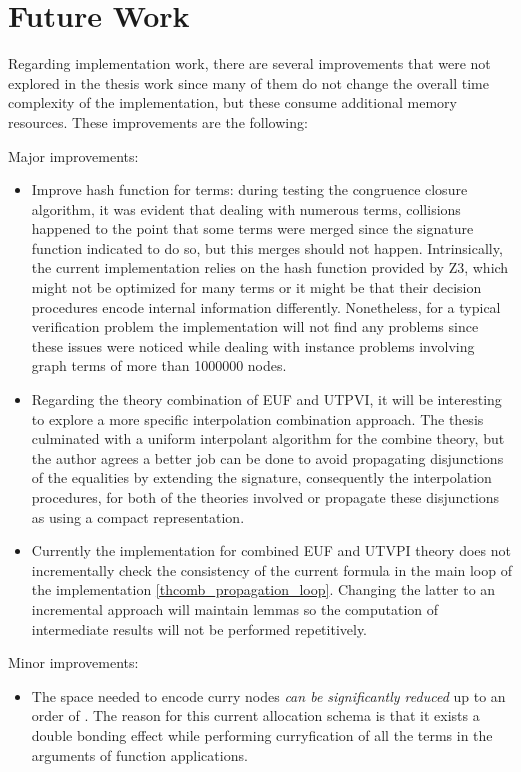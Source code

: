 \chapter{Future Work}

Regarding implementation work, there are several improvements that were not explored 
in the thesis work since many of them do not change the overall time complexity 
of the implementation, but these consume additional memory resources. 
These improvements are the following:

Major improvements:

\begin{itemize}
  \item Improve hash function for terms: during testing the congruence closure
    algorithm, it was evident that dealing with numerous terms, collisions
    happened  to the point that some terms were merged since the signature
    function indicated to do so, but this merges should not happen. 
    Intrinsically, the current implementation relies on the hash function 
    provided by Z3, which might not be optimized
    for many terms or it might
    be that their decision procedures
    encode internal information differently.
    Nonetheless, for
    a typical verification problem the implementation will not 
    find any problems since these
    issues were noticed while dealing with
    instance problems involving graph terms
    of more than 1000000 nodes.
  \item Regarding the theory combination 
    of EUF and UTPVI, it will be interesting 
    to explore a
    more specific interpolation 
    combination approach. The thesis 
    culminated with a 
    uniform interpolant algorithm for the
    combine theory, but the author agrees 
    a better job can be done to avoid 
    propagating disjunctions of the equalities
    by extending the signature, 
    consequently the interpolation 
    procedures, for both of the theories 
    involved or propagate these disjunctions as
    using a compact representation.
  \item Currently the implementation for combined EUF and UTVPI 
    theory does not incrementally check the 
    consistency of the current formula in the main loop of 
    the implementation \ref{thcomb_propagation_loop}. 
    Changing the latter to an incremental approach will
    maintain lemmas so the computation of intermediate results
    will not be performed repetitively. 
\end{itemize}

Minor improvements:

\begin{itemize}
  \item The space needed to encode curry nodes \emph{can be significantly 
    reduced} up to an order of . The reason for 
    this current allocation schema is that it exists a 
    double bonding effect while performing curryfication 
    of all the terms in the arguments of function applications.
\end{itemize}


